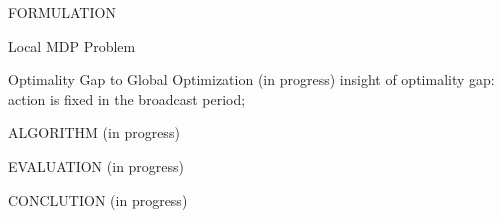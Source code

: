 \documentclass[10pt, conference, letterpaper]{IEEEtran}
\begin{document}
\begin{section}{FORMULATION}
\begin{subsection}{Local MDP Problem}
            \begin{subsubsection}{Optimality Gap to Global Optimization}
                (in progress)
                insight of optimality gap: action is fixed in the broadcast period;
            \end{subsubsection}
        \end{subsection}

    \end{section}

    \begin{section}{ALGORITHM}
        \label{sec:algorithm}
        (in progress)
    \end{section}

    \begin{section}{EVALUATION}
        \label{sec:evaluation}
        (in progress)
    \end{section}

    \begin{section}{CONCLUTION}
        \label{sec:conclusion}
        (in progress)
    \end{section}

    
    
\end{document}

